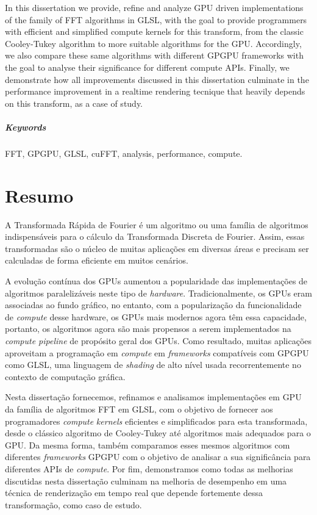 \documentclass[
  oneside,
  11pt, a4paper,
  footinclude=true,
  headinclude=true,
  cleardoublepage=empty
]{scrbook}
\begin{document}
In this dissertation we provide, refine and analyze GPU driven implementations of the family of FFT algorithms in GLSL, with the goal to provide programmers with efficient and simplified compute kernels for this transform, from the classic Cooley-Tukey algorithm to more suitable algorithms for the GPU. Accordingly, we also compare these same algorithms with different GPGPU frameworks with the goal to analyse their significance for different compute APIs. Finally, we demonstrate how all improvements discussed in this dissertation culminate in the performance improvement in a realtime rendering tecnique that heavily depends on this transform, as a case of study.

\paragraph{Keywords} FFT, GPGPU, GLSL, cuFFT, analysis, performance, compute.

    \cleardoublepage


\chapter*{Resumo}

A Transformada Rápida de Fourier é um algoritmo ou uma família de algoritmos indispensáveis para o cálculo da Transformada Discreta de Fourier. Assim, essas transformadas são o núcleo de muitas aplicações em diversas áreas e precisam ser calculadas de forma eficiente em muitos cenários.

A evolução contínua dos GPUs aumentou a popularidade das implementações de algoritmos paralelizáveis neste tipo de \textit{hardware}. Tradicionalmente, os GPUs eram associadas ao fundo gráfico, no entanto, com a popularização da funcionalidade de \textit{compute} desse hardware, os GPUs mais modernos agora têm essa capacidade, portanto, os algoritmos agora são mais propensos a serem implementados na \textit{compute pipeline} de propósito geral dos GPUs. Como resultado, muitas aplicações aproveitam a programação em \textit{compute} em \textit{frameworks} compatíveis com GPGPU como GLSL, uma linguagem de \textit{shading} de alto nível usada recorrentemente no contexto de computação gráfica.
    
Nesta dissertação fornecemos, refinamos e analisamos implementações em GPU da família de algoritmos FFT em GLSL, com o objetivo de fornecer aos programadores \textit{compute} \textit{kernels} eficientes e simplificados para esta transformada, desde o clássico algoritmo de Cooley-Tukey até algoritmos mais adequados para o GPU. Da mesma forma, também comparamos esses mesmos algoritmos com diferentes \textit{frameworks} GPGPU com o objetivo de analisar a sua significância para diferentes APIs de \textit{compute}. Por fim, demonstramos como todas as melhorias discutidas nesta dissertação culminam na melhoria de desempenho em uma técnica de renderização em tempo real que depende fortemente dessa transformação, como caso de estudo.
\end{document}
